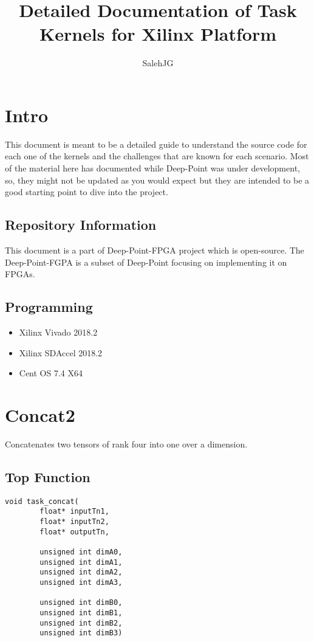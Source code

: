 \documentclass[•]{article}
\title{Detailed Documentation of Task Kernels for Xilinx Platform}
\author{SalehJG}
\begin{document}
\maketitle

\newpage
\tableofcontents
\newpage



\section{Intro}
This document is meant to be a detailed guide to understand the source code for each one of the kernels and the challenges that are known for each scenario.
Most of the material here has documented while Deep-Point was under development, so, they might not be updated as you would expect but they are intended to be a good starting point to dive into the project.

\subsection{Repository Information}
This document is a part of Deep-Point-FPGA project which is open-source. The Deep-Point-FGPA is a subset of Deep-Point focusing on implementing it on FPGAs.

\subsection{Programming}
\begin{itemize}
\item Xilinx Vivado 2018.2
\item Xilinx SDAccel 2018.2
\item Cent OS 7.4 X64
\end{itemize}

\pagebreak

\section{Concat2}
Concatenates two tensors of rank four into one over a dimension.
\subsection{Top Function}
\begin{lstlisting}
void task_concat(
		float* inputTn1,
	    float* inputTn2,
	    float* outputTn,

		unsigned int dimA0,
		unsigned int dimA1,
		unsigned int dimA2,
		unsigned int dimA3,

		unsigned int dimB0,
		unsigned int dimB1,
		unsigned int dimB2,
		unsigned int dimB3)
\end{lstlisting}
\end{document}
